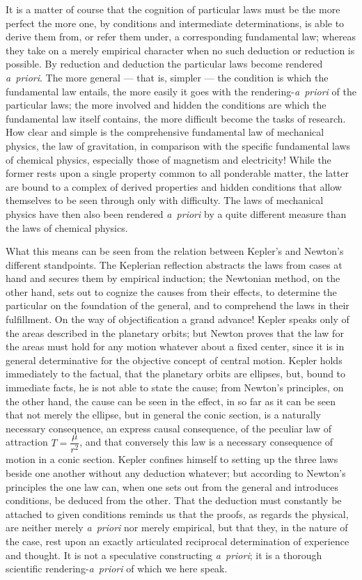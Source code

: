 \documentclass[12pt]{book}
\begin{document}
It is a matter of course that the cognition of particular laws must be the more perfect
the more one, by conditions and intermediate determinations, is able to derive them
from, or refer them under, a corresponding fundamental law; whereas they take on a
merely empirical character when no such deduction or reduction is possible. By
reduction and deduction the particular laws become rendered \textit{a~priori}. The more
general --- that is, simpler --- the condition is which the fundamental law entails, the
more easily it goes with the rendering-\textit{a~priori} of the particular laws; the more
involved and hidden the conditions are which the fundamental law itself contains, the
more difficult become the tasks of research. How clear and simple is the comprehensive
fundamental law of mechanical physics, the law of gravitation, in comparison with the
specific fundamental laws of chemical physics, especially those of magnetism and
electricity! While the former rests upon a single property common to all ponderable
matter, the latter are bound to a complex of derived properties and hidden conditions
that allow themselves to be seen through only with difficulty. The laws of mechanical
physics have then also been rendered \textit{a~priori} by a quite different measure than
the laws of chemical physics.

What this means can be seen from the relation between Kepler's and Newton's different
standpoints. The Keplerian reflection abstracts the laws from cases at hand and secures
them by empirical induction; the Newtonian method, on the other hand, sets out to
cognize the causes from their effects, to determine the particular on the foundation of
the general, and to comprehend the laws in their fulfillment. On the way of
objectification a grand advance! Kepler speaks only of the areas described in the
planetary orbits; but Newton proves that the law for the areas must hold for any motion
whatever about a fixed center, since it is in general determinative for the objective
concept of central motion. Kepler holds immediately to the factual, that the planetary
orbits are ellipses, but, bound to immediate facts, he is not able to state the cause;
from Newton's principles, on the other hand, the cause can be seen in the effect, in so
far as it can be seen that not merely the ellipse, but in general the conic section, is a
naturally necessary consequence, an express causal consequence, of the peculiar law of
attraction $T = \dfrac{\mu}{r^2}$, and that conversely this law is a necessary
consequence of motion in a conic section. Kepler confines himself to setting up the
three laws beside one another without any deduction whatever; but according to Newton's
principles the one law can, when one sets out from the general and introduces
conditions, be deduced from the other. That the deduction must constantly be attached to
given conditions reminds us that the proofs, as regards the physical, are neither merely
\textit{a~priori} nor merely empirical, but that they, in the nature of the case, rest
upon an exactly articulated reciprocal determination of experience and thought. It is
not a speculative constructing \textit{a~priori}; it is a thorough scientific
rendering-\textit{a~priori} of which we here speak.
\end{document}
